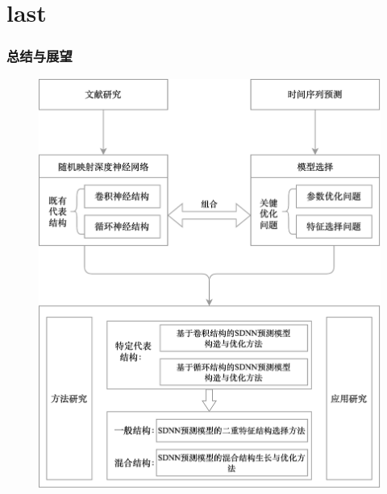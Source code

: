 \section{last}

\begin{frame}
    \frametitle{总结与展望}

    \begin{figure}[!t]
        \begin{minipage}{0.45\textwidth}
            \centering
            \includegraphics[width=0.825\linewidth]{float/ch.intro/thesis_arch.png}

\end{minipage}
\end{figure}
\end{frame}
